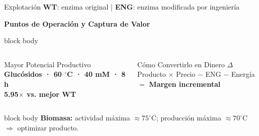 \begin{frame}{Explotación \hfill{\tiny\color{TextoSuave}\textbf{WT}: enzima original \quad | \quad \textbf{ENG}: enzima modificada por ingeniería}}



{\color{Cian}\bfseries Puntos de Operación y Captura de Valor}\par
\vspace{0.01cm}

\begin{beamercolorbox}[wd=\linewidth,sep=0.06cm,rounded=true]{block body}
\centering
{}
\end{beamercolorbox}

\vspace{0.03cm}
\begin{columns}[T,onlytextwidth]
\begin{alertblock}{Mayor Potencial Productivo}
\centering\footnotesize\bfseries
Glucósidos · 60 $^{\circ}$C · 40 mM · 8 h\\
5.95$\times$ vs. mejor WT
\end{alertblock}

\begin{block}{Cómo Convertirlo en Dinero}
\centering\footnotesize
$\Delta$Producto $\times$ Precio $-$ ENG $-$ Energía\\
$=$ \textbf{Margen incremental}
\end{block}
\end{columns}

\vspace{0.02cm}
\begin{beamercolorbox}[wd=\linewidth,sep=0.05cm,rounded=true,center]{block body}
\scriptsize \textbf{Biomasa:} actividad máxima $\approx75^{\circ}$C; producción máxima $\approx70^{\circ}$C $\Rightarrow$ optimizar producto.
\end{beamercolorbox}
\end{frame}
